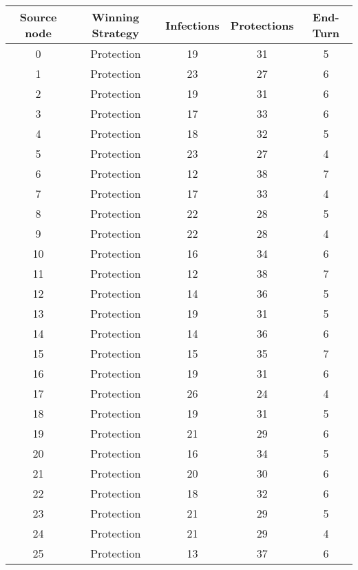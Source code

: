 \documentclass[results.tex]{subfiles}
\begin{document}
\begin{center}
  \begin{tabular}{| c || c | c | c | c |}
    \hline
    {\bfseries Source node} & {\bfseries Winning Strategy} & {\bfseries Infections} & {\bfseries Protections} & {\bfseries End-Turn} \\  %
    \hline\hline
    0 & Protection & 19 & 31 & 5 \\ 
    \hline
    1 & Protection & 23 & 27 & 6 \\ 
    \hline
    2 & Protection & 19 & 31 & 6 \\ 
    \hline
    3 & Protection & 17 & 33 & 6 \\ 
    \hline
    4 & Protection & 18 & 32 & 5 \\ 
    \hline
    5 & Protection & 23 & 27 & 4 \\ 
    \hline
    6 & Protection & 12 & 38 & 7 \\ 
    \hline
    7 & Protection & 17 & 33 & 4 \\ 
    \hline
    8 & Protection & 22 & 28 & 5 \\ 
    \hline
    9 & Protection & 22 & 28 & 4 \\ 
    \hline
    10 & Protection & 16 & 34 & 6 \\ 
    \hline
    11 & Protection & 12 & 38 & 7 \\ 
    \hline
    12 & Protection & 14 & 36 & 5 \\ 
    \hline
    13 & Protection & 19 & 31 & 5 \\ 
    \hline
    14 & Protection & 14 & 36 & 6 \\ 
    \hline
    15 & Protection & 15 & 35 & 7 \\ 
    \hline
    16 & Protection & 19 & 31 & 6 \\ 
    \hline
    17 & Protection & 26 & 24 & 4 \\ 
    \hline
    18 & Protection & 19 & 31 & 5 \\ 
    \hline
    19 & Protection & 21 & 29 & 6 \\ 
    \hline
    20 & Protection & 16 & 34 & 5 \\ 
    \hline
    21 & Protection & 20 & 30 & 6 \\ 
    \hline
    22 & Protection & 18 & 32 & 6 \\ 
    \hline
    23 & Protection & 21 & 29 & 5 \\ 
    \hline
    24 & Protection & 21 & 29 & 4 \\ 
    \hline
    25 & Protection & 13 & 37 & 6 \\ 

\end{tabular}
\end{center}
\end{document}
